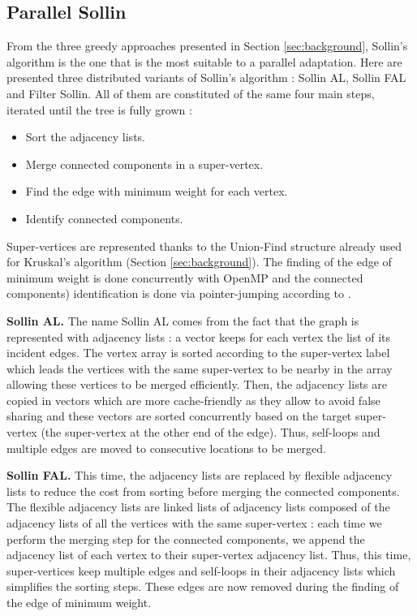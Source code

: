 \documentclass[letterpaper]{article}
\newcommand{\mypar}[1]{{\bf #1.}}
\begin{document}
\subsection{Parallel Sollin} \label{sec:parSollin}

From the three greedy approaches presented in Section \ref{sec:background}, Sollin's algorithm is the one that is the most suitable to a parallel adaptation. Here are presented three distributed variants of Sollin's algorithm : Sollin AL, Sollin FAL and Filter Sollin. All of them are constituted of the same four main steps, iterated until the tree is fully grown :
\begin{itemize}
    \item Sort the adjacency lists.
    \item Merge connected components in a super-vertex.
    \item Find the edge with minimum weight for each vertex.
    \item Identify connected components.
\end{itemize}

Super-vertices are represented thanks to the Union-Find structure already used for Kruskal's algorithm (Section \ref{sec:background}). The finding of the edge of minimum weight is done concurrently with OpenMP and the connected components) identification is done via pointer-jumping according to \cite{pointerJump}.

\mypar{Sollin AL} The name Sollin AL comes from the fact that the graph is represented with adjacency lists : a vector keeps for each vertex the list of its incident edges. The vertex array is sorted according to the super-vertex label which leads the vertices with the same super-vertex to be nearby in the array allowing these vertices to be merged efficiently. Then, the adjacency lists are copied in vectors which are more cache-friendly as they allow to avoid false sharing \cite{cache} and these vectors are sorted concurrently based on the target super-vertex (the super-vertex at the other end of the edge).  Thus, self-loops and multiple edges are moved to consecutive locations to be merged.

\mypar{Sollin FAL} This time, the adjacency lists are replaced by flexible adjacency lists to reduce the cost from sorting before merging the connected components. The flexible adjacency lists are linked lists of adjacency lists composed of the adjacency lists of all the vertices with the same super-vertex : each time we perform the merging step for the connected components, we append the adjacency list of each vertex to their super-vertex adjacency list. Thus, this time, super-vertices keep multiple edges and self-loops in their adjacency lists which simplifies the sorting steps. These edges are now removed during the finding of the edge of minimum weight.
\end{document}
